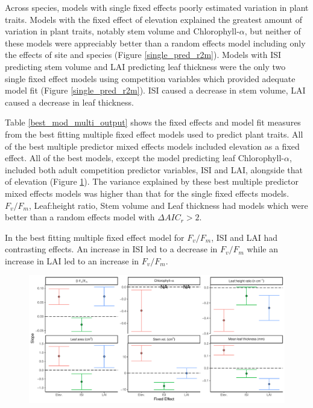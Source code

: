\documentclass[a4paper, 11pt]{article}
\begin{document}
Across species, models with single fixed effects poorly estimated variation in plant traits. Models with the fixed effect of elevation explained the greatest amount of variation in plant traits, notably stem volume and Chlorophyll-$\alpha$, but neither of these models were appreciably better than a random effects model including only the effects of site and species (Figure \ref{single_pred_r2m}). Models with ISI predicting stem volume and LAI predicting leaf thickness were the only two single fixed effect models using competition variables which provided adequate model fit (Figure \ref{single_pred_r2m}). ISI caused a decrease in stem volume, LAI caused a decrease in leaf thickness.

Table \ref{best_mod_multi_output} shows the fixed effects and model fit measures from the best fitting multiple fixed effect models used to predict plant traits. All of the best multiple predictor mixed effects models included elevation as a fixed effect. All of the best models, except the model predicting leaf Chlorophyll-$\alpha$, included both adult competition predictor variables, ISI and LAI, alongside that of elevation (Figure \ref{multi_pred_slope}). The variance explained by these best multiple predictor mixed effects models was higher than that for the single fixed effects models. $F_v/F_m$, Leaf:height ratio, Stem volume and Leaf thickness had models which were better than a random effects model with $\Delta{}AIC_r > 2$.

In the best fitting multiple fixed effect model for $F_v/F_m$, ISI and LAI had contrasting effects. An increase in ISI led to a decrease in $F_v/F_m$ while an increase in LAI led to an increase in $F_v/F_m$. 

\begin{figure}[H]
\includegraphics[width=\textwidth]{multi_pred_slope}
\centering
\caption{}
\label{multi_pred_slope}
\end{figure}
\end{document}
